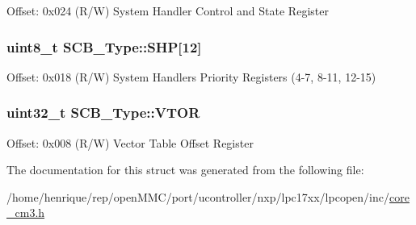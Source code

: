 Offset\-: 0x024 (R/\-W) System Handler Control and State Register \hypertarget{structSCB__Type_af6336103f8be0cab29de51daed5a65f4}{
\subsubsection[{S\-H\-P}]{ uint8\-\_\-t S\-C\-B\-\_\-\-Type\-::\-S\-H\-P\mbox{[}12\mbox{]}}}\label{structSCB__Type_af6336103f8be0cab29de51daed5a65f4}
Offset\-: 0x018 (R/\-W) System Handlers Priority Registers (4-\/7, 8-\/11, 12-\/15) \hypertarget{structSCB__Type_a0faf96f964931cadfb71cfa54e051f6f}{
\subsubsection[{V\-T\-O\-R}]{ uint32\-\_\-t S\-C\-B\-\_\-\-Type\-::\-V\-T\-O\-R}}\label{structSCB__Type_a0faf96f964931cadfb71cfa54e051f6f}
Offset\-: 0x008 (R/\-W) Vector Table Offset Register 

The documentation for this struct was generated from the following file\-:\begin{DoxyCompactItemize}
\item 
/home/henrique/rep/open\-M\-M\-C/port/ucontroller/nxp/lpc17xx/lpcopen/inc/\hyperlink{core__cm3_8h}{core\-\_\-cm3.\-h}\end{DoxyCompactItemize}
